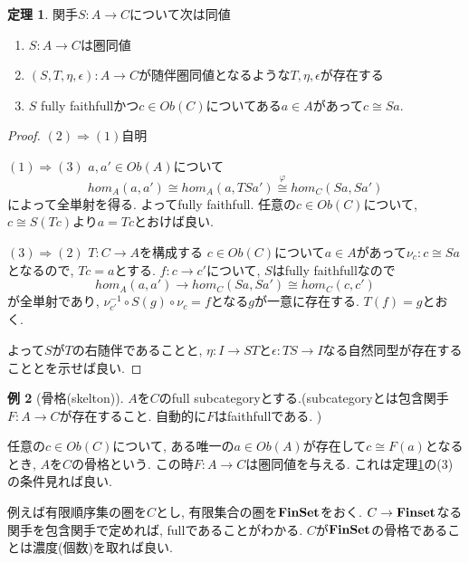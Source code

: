 \documentclass[dvipdfmx,a4paper,11pt]{report}
\theoremstyle{definition}
\newtheorem{thm}{定理}
\newtheorem{exa}[thm]{例}
\begin{document}
 \begin{tcolorbox}
 [colback = white, colframe = green!35!black, fonttitle = \bfseries,breakable = true]
\begin{thm}
\label{thm-adjoint-equiv}
関手$S : A \to C$について次は同値
\begin{enumerate}
\item $S : A \to C$は圏同値
\item $(S,T,\eta,\epsilon): A\to C$が随伴圏同値となるような$T,\eta,\epsilon$が存在する
\item $S$ fully faithfullかつ$c \in Ob(C)$についてある$a \in A$があって$c \cong Sa$.
\end{enumerate}
\end{thm}
\end{tcolorbox}
\begin{proof}
$(2) \Rightarrow (1)$自明

$(1) \Rightarrow (3)$
$a, a' \in Ob(A)$について
$$
hom_{A}(a, a') \cong hom_{A}(a ,TSa') \overset{\varphi}{\cong} hom_{C}(Sa, Sa') 
$$
によって全単射を得る. よってfully faithfull.
任意の$c \in Ob(C)$について, $c \cong S(Tc)$より$a=Tc$とおけば良い.


$(3) \Rightarrow (2)$
$T : C \to A$を構成する
$c \in Ob(C)$について$a \in A$があって$\nu_c : c \cong Sa$となるので, $Tc = a$とする.
$f  : c \to c'$について, $S$はfully faithfullなので
$$
hom_{A}(a,a') \to hom_{C}(Sa, Sa') \cong hom_{C}(c, c')
$$
が全単射であり, $\nu_{c'}^{-1}\circ S(g) \circ \nu_{c}=f$となる$g$が一意に存在する.
$T(f) = g$とおく.

よって$S$が$T$の右随伴であることと, $\eta : I \to ST$と$\epsilon : TS \to I$なる自然同型が存在することとを示せば良い.
\end{proof}

\begin{exa}[骨格(skelton)]
$A$を$C$のfull subcategoryとする.(subcategoryとは包含関手 $F : A \to C$が存在すること. 自動的に$F$はfaithfullである. )

任意の$c \in Ob(C)$について, ある唯一の$a \in Ob(A)$が存在して$c \cong F(a)$となるとき, $A$を$C$の骨格という. 
この時$F : A \to C$は圏同値を与える.
これは定理\ref{thm-adjoint-equiv}の(3)の条件見れば良い. 

例えば有限順序集の圏を$C$とし, 有限集合の圏を${\bf FinSet}$をおく.
$C \to {\bf Finset }$なる関手を包含関手で定めれば, fullであることがわかる.
$C$が${\bf FinSet}$の骨格であることは濃度(個数)を取れば良い. 
\end{exa}
\end{document}
